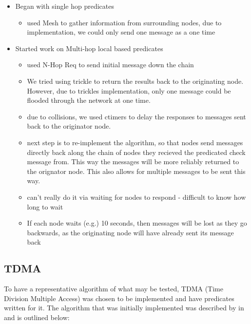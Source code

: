 \begin{itemize}
	\item[] Began with single hop predicates
	\begin{itemize}
		\item used Mesh to gather information from surrounding nodes, due to implementation, we could only send one message as a one time
	\end{itemize}	
	\item[] Started work on Multi-hop local based predicates
	\begin{itemize}
		\item used N-Hop Req to send initial message down the chain
		\item We tried using trickle to return the results back to the originating node. However, due to trickles implementation, only one message could be flooded through the network at one time. 
		\item due to collisions, we used ctimers to delay the responses to messages sent back to the originator node.
		\item next step is to re-implement the algorithm, so that nodes send messages directly back along the chain of nodes they recieved the predicated check message from. This way the messages will be more reliably returned to the orignator node. This also allows for multiple messages to be sent this way.
		\item can't really do it via waiting for nodes to respond - difficult to know how long to wait
		\item[] If each node waits (e.g.) 10 seconds, then messages will be lost as they go backwards, as the originating node will have already sent its message back
	\end{itemize}	
\end{itemize}


\subsection{TDMA}

To have a representative algorithm of what may be tested, TDMA (Time Division Multiple Access) was chosen to be implemented and have predicates written for it. The algorithm that was initially implemented was described by \citeauthor{DCATechReport} in \cite[p.~4]{DCATechReport} and is outlined below:

